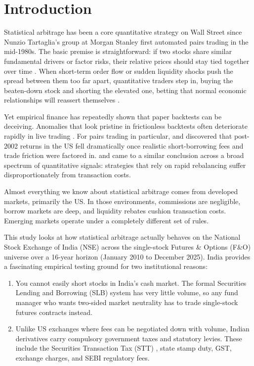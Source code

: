 \section{Introduction}
\label{sec:intro}

Statistical arbitrage has been a core quantitative strategy on Wall Street since Nunzio Tartaglia's group at Morgan Stanley first automated pairs trading in the mid-1980s. The basic premise is straightforward: if two stocks share similar fundamental drivers or factor risks, their relative prices should stay tied together over time \citep{gatev2006pairs,vidyamurthy2004pairs}. When short-term order flow or sudden liquidity shocks push the spread between them too far apart, quantitative traders step in, buying the beaten-down stock and shorting the elevated one, betting that normal economic relationships will reassert themselves \citep{avellaneda2010statistical,krauss2017statistical,gu2020empirical}.

Yet empirical finance has repeatedly shown that paper backtests can be deceiving. Anomalies that look pristine in frictionless backtests often deteriorate rapidly in live trading \citep{mclean2016does,hou2020replicating}. For pairs trading in particular, \citet{do2010does} and \citet{do2012are} discovered that post-2002 returns in the US fell dramatically once realistic short-borrowing fees and trade friction were factored in. \citet{novymarx2016taxonomy} and \citet{frazzini2018trading} came to a similar conclusion across a broad spectrum of quantitative signals: strategies that rely on rapid rebalancing suffer disproportionately from transaction costs.

Almost everything we know about statistical arbitrage comes from developed markets, primarily the US. In those environments, commissions are negligible, borrow markets are deep, and liquidity rebates cushion transaction costs. Emerging markets operate under a completely different set of rules.

This study looks at how statistical arbitrage actually behaves on the National Stock Exchange of India (NSE) across the single-stock Futures \& Options (F\&O) universe over a 16-year horizon (January 2010 to December 2025). India provides a fascinating empirical testing ground for two institutional reasons:
\begin{enumerate}
    \item You cannot easily short stocks in India's cash market. The formal Securities Lending and Borrowing (SLB) system has very little volume, so any fund manager who wants two-sided market neutrality has to trade single-stock futures contracts instead.
    \item Unlike US exchanges where fees can be negotiated down with volume, Indian derivatives carry compulsory government taxes and statutory levies. These include the Securities Transaction Tax (STT) \citep{bose2007securities}, state stamp duty, GST, exchange charges, and SEBI regulatory fees.
\end{enumerate}


